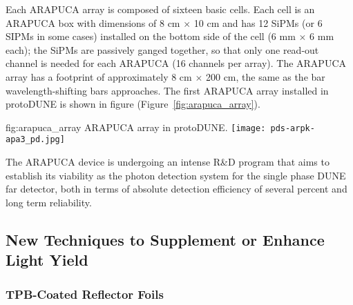 Each ARAPUCA array is composed of sixteen basic cells. Each cell is an ARAPUCA box with dimensions of 8 cm $\times$ 10 cm and has 12 SiPMs (or 6 SIPMs in some cases) installed on the bottom side of the cell (6 mm $\times$ 6 mm each); the SiPMs  are passively ganged together, so that only one read-out channel is needed for each  ARAPUCA (16 channels per array).  The ARAPUCA array has a footprint of approximately 8 cm $\times$ 200 cm, the same as the bar wavelength-shifting bars approaches. The first ARAPUCA array installed in protoDUNE is shown in figure (Figure~\ref{fig:arapuca_array}).

\begin{dunefigure}{fig:arapuca_array}
{ARAPUCA array in protoDUNE.} 	
\texttt{[image: pds-arpk-apa3\_pd.jpg]} 
\end{dunefigure}


The ARAPUCA device is undergoing an intense R\&D program that aims to establish its 
viability as the photon detection system for the single phase DUNE far detector, both 
in terms of absolute detection efficiency of several percent and long term reliability.


\subsection{New Techniques to Supplement or Enhance Light Yield}
\label{sec:fdsp-pd-enh}



\subsubsection{TPB-Coated Reflector Foils}


